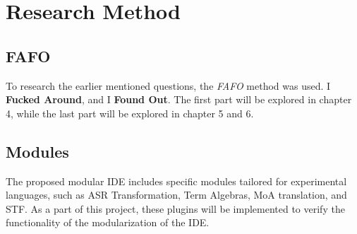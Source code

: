\chapter{Research Method}

\section{FAFO}

To research the earlier mentioned questions, the \textit{FAFO} method was used.
I \textbf{Fucked Around}, and I \textbf{Found Out}. The first part will be explored in chapter 4,
while the last part will be explored in chapter 5 and 6.


\section{Modules}

The proposed modular IDE includes specific modules tailored for experimental
languages, such as ASR Transformation, Term Algebras, MoA translation, and STF.
As a part of this project, these plugins will be implemented to verify the
functionality of the modularization of the IDE.
